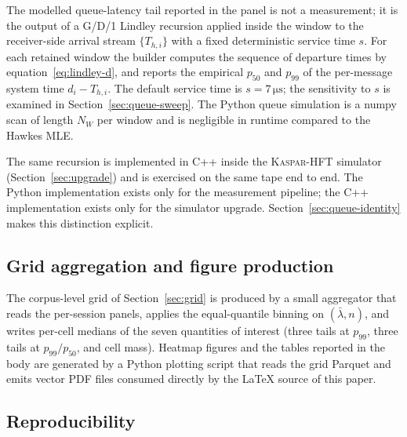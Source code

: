 \documentclass[11pt]{article}
\newcommand{\kasparhft}{\textsc{Kaspar-HFT}}
\begin{document}
The modelled queue-latency tail reported in the panel is not a measurement; it is the output of a G/D/1 Lindley recursion applied inside the window to the receiver-side arrival stream $\{T_{h,i}\}$ with a fixed deterministic service time $s$. For each retained window the builder computes the sequence of departure times by equation~\eqref{eq:lindley-d}, and reports the empirical $p_{50}$ and $p_{99}$ of the per-message system time $d_i - T_{h,i}$. The default service time is $s = 7\,\si{\micro\second}$; the sensitivity to $s$ is examined in Section~\ref{sec:queue-sweep}. The Python queue simulation is a numpy scan of length $N_W$ per window and is negligible in runtime compared to the Hawkes MLE.

The same recursion is implemented in C++ inside the \kasparhft{} simulator (Section~\ref{sec:upgrade}) and is exercised on the same tape end to end. The Python implementation exists only for the measurement pipeline; the C++ implementation exists only for the simulator upgrade. Section~\ref{sec:queue-identity} makes this distinction explicit.

\subsection{Grid aggregation and figure production}
\label{sec:pipeline-grid}

The corpus-level grid of Section~\ref{sec:grid} is produced by a small aggregator that reads the per-session panels, applies the equal-quantile binning on $(\bar\lambda, n)$, and writes per-cell medians of the seven quantities of interest (three tails at $p_{99}$, three tails at $p_{99}/p_{50}$, and cell mass). Heatmap figures and the tables reported in the body are generated by a Python plotting script that reads the grid Parquet and emits vector PDF files consumed directly by the \LaTeX{} source of this paper.

\subsection{Reproducibility}
\label{sec:pipeline-repro}
\end{document}
